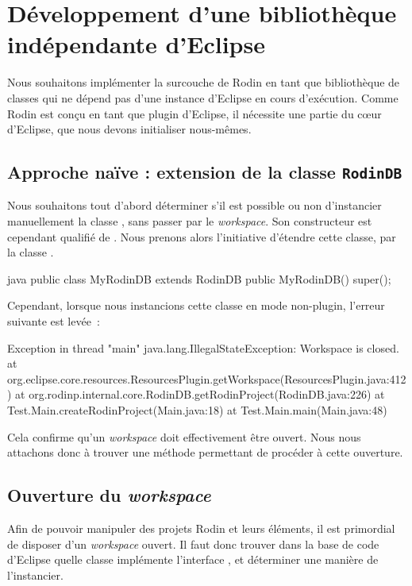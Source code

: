 \section{Développement d'une bibliothèque indépendante d'Eclipse}

Nous souhaitons implémenter la surcouche de Rodin en tant que bibliothèque de classes qui ne dépend pas d'une instance d'Eclipse en cours d'exécution.
Comme Rodin est conçu en tant que plugin d'Eclipse, il nécessite une partie du cœur d'Eclipse, que nous devons initialiser nous-mêmes.

\subsection{Approche naïve : extension de la classe \texttt{RodinDB}}

Nous souhaitons tout d'abord déterminer s'il est possible ou non d'instancier manuellement la classe , sans passer par le \textit{workspace}.
Son constructeur est cependant qualifié de .
Nous prenons alors l'initiative d'étendre cette classe, par la classe .

\begin{imtaCode}{java}
public class MyRodinDB extends RodinDB {
    public MyRodinDB() {
        super();
    }
}
\end{imtaCode}

Cependant, lorsque nous instancions cette classe en mode non-plugin, l'erreur suivante est levée~:

\begin{imtaConsole}
Exception in thread "main" java.lang.IllegalStateException: Workspace is closed.
	at org.eclipse.core.resources.ResourcesPlugin.getWorkspace(ResourcesPlugin.java:412)
	at org.rodinp.internal.core.RodinDB.getRodinProject(RodinDB.java:226)
	at Test.Main.createRodinProject(Main.java:18)
	at Test.Main.main(Main.java:48)
\end{imtaConsole}

Cela confirme qu'un \textit{workspace} doit effectivement être ouvert.
Nous nous attachons donc à trouver une méthode permettant de procéder à cette ouverture.


\subsection{Ouverture du \textit{workspace}}

Afin de pouvoir manipuler des projets Rodin et leurs éléments, il est primordial de disposer d'un \textit{workspace} ouvert.
Il faut donc trouver dans la base de code d'Eclipse quelle classe implémente l'interface , et déterminer une manière de l'instancier.

